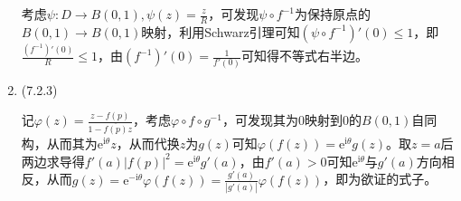 \documentclass[a4paper,UTF8,fontset=windows]{ctexart}
\begin{document}
\begin{enumerate}
    考虑$\psi:D\to B(0,1),\psi(z)=\frac{z}{R}$，可发现$\psi\circ f^{-1}$为保持原点的$B(0,1)\to B(0,1)$映射，利用Schwarz引理可知$(\psi\circ f^{-1})'(0)\le 1$，即$\frac{(f^{-1})'(0)}{R}\le1$，由$(f^{-1})'(0)=\frac{1}{f'(0)}$可知得不等式右半边。
    
    \item (7.2.3)
    
    记$\varphi(z)=\frac{z-f(p)}{1-\overline{f(p)}z}$，考虑$\varphi\circ f\circ g^{-1}$，可发现其为0映射到0的$B(0,1)$自同构，从而其为$\mathrm{e}^{\mathrm{i}\theta}z$，从而代换$z$为$g(z)$可知$\varphi(f(z))=\mathrm{e}^{\mathrm{i}\theta}g(z)$。取$z=a$后两边求导得$f'(a)|f(p)|^2=\mathrm{e}^{\mathrm{i}\theta}g'(a)$，由$f'(a)>0$可知$\mathrm{e}^{\mathrm{i}\theta}$与$g'(a)$方向相反，从而$g(z)=\mathrm{e}^{-\mathrm{i}\theta}\varphi(f(z))=\frac{g'(a)}{|g'(a)|}\varphi(f(z))$，即为欲证的式子。
\end{enumerate}
\end{document}
